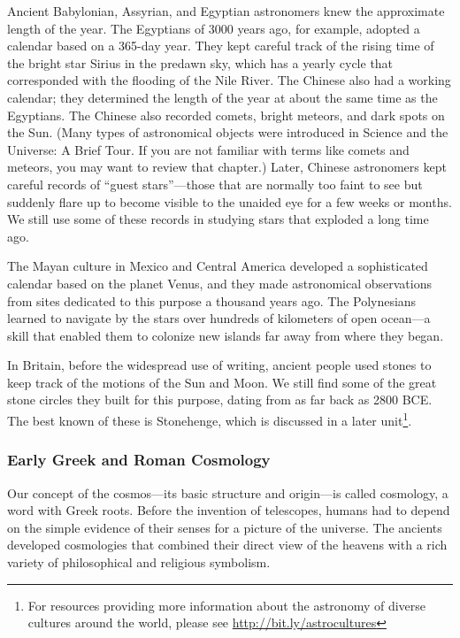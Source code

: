\documentclass[main.tex]{subfiles}
\begin{document}
Ancient Babylonian, Assyrian, and Egyptian astronomers knew the approximate length of the year. The Egyptians of 3000 years ago, for example, adopted a calendar based on a 365-day year. They kept careful track of the rising time of the bright star Sirius in the predawn sky, which has a yearly cycle that corresponded with the flooding of the Nile River. The Chinese also had a working calendar; they determined the length of the year at about the same time as the Egyptians. The Chinese also recorded comets, bright meteors, and dark spots on the Sun. (Many types of astronomical objects were introduced in Science and the Universe: A Brief Tour. If you are not familiar with terms like comets and meteors, you may want to review that chapter.) Later, Chinese astronomers kept careful records of ``guest stars''---those that are normally too faint to see but suddenly flare up to become visible to the unaided eye for a few weeks or months. We still use some of these records in studying stars that exploded a long time ago.

\vspace{1em}

The Mayan culture in Mexico and Central America developed a sophisticated calendar based on the planet Venus, and they made astronomical observations from sites dedicated to this purpose a thousand years ago. The Polynesians learned to navigate by the stars over hundreds of kilometers of open ocean---a skill that enabled them to colonize new islands far away from where they began.

\vspace{1em}

In Britain, before the widespread use of writing, ancient people used stones to keep track of the motions of the Sun and Moon. We still find some of the great stone circles they built for this purpose, dating from as far back as 2800 BCE. The best known of these is Stonehenge, which is discussed in a later unit\footnote{For resources providing more information about the astronomy of diverse cultures around the world, please see \href{http://bit.ly/astrocultures}{http://bit.ly/astrocultures}}.

\subsubsection*{Early Greek and Roman Cosmology}

Our concept of the cosmos---its basic structure and origin---is called \gls{cosmology}, a word with Greek roots. Before the invention of telescopes, humans had to depend on the simple evidence of their senses for a picture of the universe. The ancients developed cosmologies that combined their direct view of the heavens with a rich variety of philosophical and religious symbolism.
\end{document}
